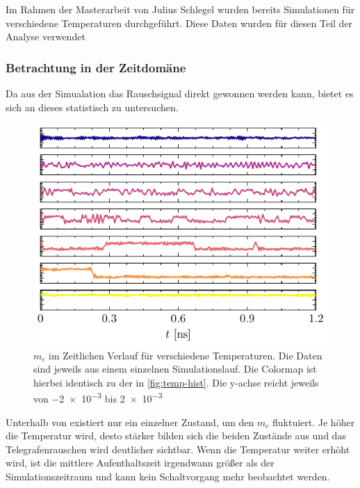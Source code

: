 \documentclass[main.tex]{subfiles}
\begin{document}
Im Rahmen der Masterarbeit von Julius Schlegel \cite{schlegel-master} wurden bereits Simulationen für verschiedene Temperaturen durchgeführt. Diese Daten wurden für diesen Teil der Analyse verwendet

\subsubsection{Betrachtung in der Zeitdomäne}

Da aus der Simualation das Rauschsignal direkt gewonnen werden kann, bietet es sich an dieses statistisch zu untersuchen.

\begin{figure}[H]
    \centering
    \includegraphics{bilder/plots/temp_comparison_long/mc_time.pdf}
    \caption{\(m_c\) im Zeitlichen Verlauf für verschiedene Temperaturen. Die Daten sind jeweils aus einem einzelnen Simulationslauf. Die Colormap ist hierbei identisch zu der in \cref{fig:temp-hist}. Die y-achse reicht jeweils von \num{-2e-3} bis \num{+2e-3}}\label{fig:temp-time}
\end{figure}

Unterhalb von  existiert nur ein einzelner Zustand, um den \(m_c\) fluktuiert. Je höher die Temperatur wird, desto stärker bilden sich die beiden Zustände aus und das Telegrafenrauschen wird deutlicher sichtbar. Wenn die Temperatur weiter erhöht wird, ist die mittlere Aufenthaltszeit irgendwann größer als der Simulationszeitraum und kann kein Schaltvorgang mehr beobachtet werden.
\end{document}
